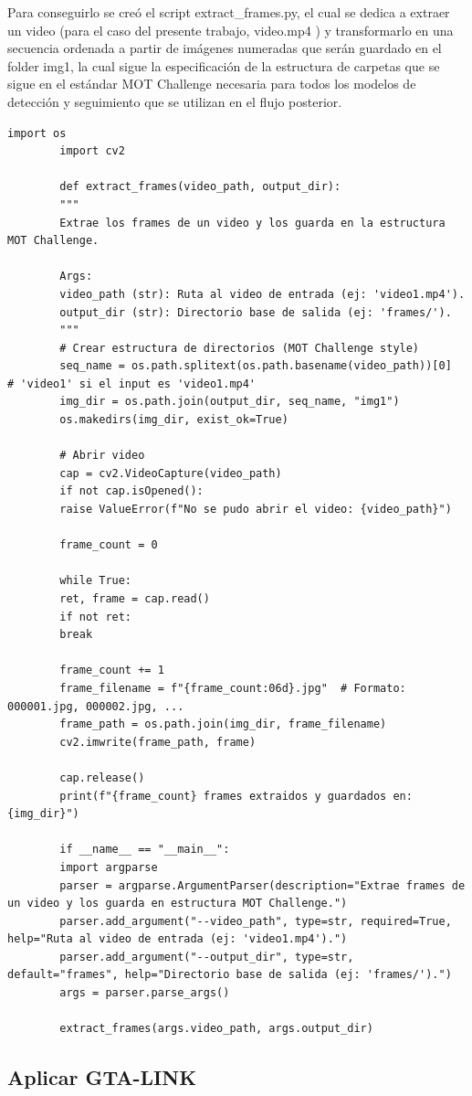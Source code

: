 \documentclass[12pt, a4paper, twoside]{article}
\begin{document}
	Para conseguirlo se creó el script extract\_frames.py, el cual se dedica a extraer un video (para el caso del presente trabajo, video.mp4 ) y transformarlo en una secuencia ordenada a partir de imágenes numeradas que serán guardado en el folder img1, la cual sigue la especificación de la estructura de carpetas que se sigue en el estándar MOT Challenge necesaria para todos los modelos de detección y seguimiento que se utilizan en el flujo posterior.
	\vspace{0.5cm}
	\begin{lstlisting}[style=pythonstyle]
		import os
		import cv2
		
		def extract_frames(video_path, output_dir):
		"""
		Extrae los frames de un video y los guarda en la estructura MOT Challenge.
		
		Args:
		video_path (str): Ruta al video de entrada (ej: 'video1.mp4').
		output_dir (str): Directorio base de salida (ej: 'frames/').
		"""
		# Crear estructura de directorios (MOT Challenge style)
		seq_name = os.path.splitext(os.path.basename(video_path))[0]  # 'video1' si el input es 'video1.mp4'
		img_dir = os.path.join(output_dir, seq_name, "img1")
		os.makedirs(img_dir, exist_ok=True)
		
		# Abrir video
		cap = cv2.VideoCapture(video_path)
		if not cap.isOpened():
		raise ValueError(f"No se pudo abrir el video: {video_path}")
		
		frame_count = 0
		
		while True:
		ret, frame = cap.read()
		if not ret:
		break
		
		frame_count += 1
		frame_filename = f"{frame_count:06d}.jpg"  # Formato: 000001.jpg, 000002.jpg, ...
		frame_path = os.path.join(img_dir, frame_filename)
		cv2.imwrite(frame_path, frame)
		
		cap.release()
		print(f"{frame_count} frames extraidos y guardados en: {img_dir}")
		
		if __name__ == "__main__":
		import argparse
		parser = argparse.ArgumentParser(description="Extrae frames de un video y los guarda en estructura MOT Challenge.")
		parser.add_argument("--video_path", type=str, required=True, help="Ruta al video de entrada (ej: 'video1.mp4').")
		parser.add_argument("--output_dir", type=str, default="frames", help="Directorio base de salida (ej: 'frames/').")
		args = parser.parse_args()
		
		extract_frames(args.video_path, args.output_dir)
	\end{lstlisting}
	
	\subsection{Aplicar GTA-LINK}
	
\end{document}
